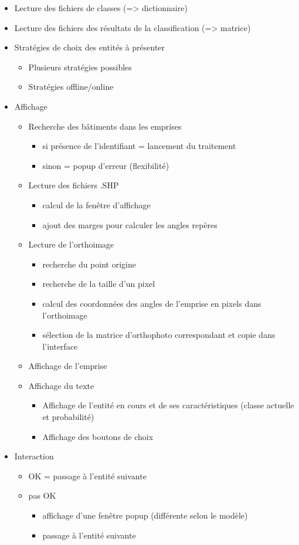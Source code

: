 \begin{itemize}
	\item Lecture des fichiers de classes (=> dictionnaire)
	\item Lecture des fichiers des résultats de la classification (=> matrice)
	\item Stratégies de choix des entités à présenter
	\begin{itemize}
		\item Plusieurs stratégies possibles
		\item Stratégies offline/online
	\end{itemize}
	\item Affichage
	\begin{itemize}
		\item Recherche des bâtiments dans les emprises
		\begin{itemize}
			\item si présence de l'identifiant = lancement du traitement
			\item sinon = popup d'erreur (flexibilité)
		\end{itemize}
		\item Lecture des fichiers .SHP
		\begin{itemize}
			\item calcul de la fenêtre d'affichage
			\item ajout des marges pour calculer les angles repères
		\end{itemize}
		\item Lecture de l'orthoimage
		\begin{itemize}
			\item recherche du point origine
			\item recherche de la taille d'un pixel
			\item calcul des coordonnées des angles de l'emprise en pixels dans l'orthoimage
			\item sélection de la matrice d'orthophoto correspondant et copie dans l'interface
		\end{itemize}
		\item Affichage de l'emprise
		\item Affichage du texte
		\begin{itemize}
			\item Affichage de l'entité en cours et de ses caractéristiques (classe actuelle et probabilité)
			\item Affichage des boutons de choix
		\end{itemize}
	\end{itemize}
	\item Interaction
	\begin{itemize}
		\item OK = passage à l'entité suivante
		\item pas OK
		\begin{itemize}
			\item affichage d'une fenêtre popup (différente selon le modèle)
			\item passage à l'entité suivante
		\end{itemize}
	\end{itemize}
\end{itemize}


